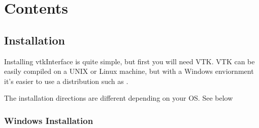 \documentclass[letterpaper,10pt,english]{sphinxmanual}
\begin{document}
\begin{sphinxVerbatim}[commandchars=\\\{\}]
  
       \PYG{p}{[}\PYG{p}{]}
        
    \PYG{p}{[} \PYG{p}{]}  


 
\end{sphinxVerbatim}

\noindent{}


\chapter{Contents}
\label{\detokenize{index:contents}}

\section{Installation}
\label{\detokenize{installation:installation}}\label{\detokenize{installation:install-ref}}\label{\detokenize{installation::doc}}
Installing vtkInterface is quite simple, but first you will need VTK.
VTK can be easily compiled on a UNIX or Linux machine, but with a Windows
enviornment it’s easier to use a distribution such as
.

The installation directions are different depending on your OS.  See below


\subsection{Windows Installation}
\label{\detokenize{installation:windows-installation}}
\end{document}
